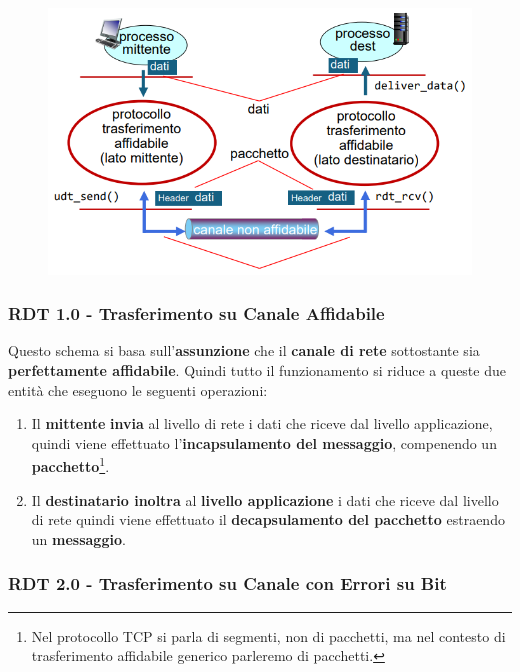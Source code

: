 \documentclass{article}
\begin{document}
\begin{figure}[htbp]
    \center
    \includegraphics[scale=0.65]{img/trasferimentoAffidabile1.png}
\end{figure}

\newpage

\subsubsection{RDT 1.0 - Trasferimento su Canale Affidabile}

Questo schema si basa sull'\textbf{assunzione} che il \textbf{canale di rete} sottostante sia \textbf{perfettamente affidabile}.
Quindi tutto il funzionamento si riduce a queste due entità che eseguono le seguenti operazioni:

\begin{enumerate}
    \item Il \textbf{mittente} \textbf{invia} al livello di rete i dati che riceve dal livello applicazione, quindi viene effettuato l'\textbf{incapsulamento del messaggio}, compenendo un \textbf{pacchetto}\footnote{Nel protocollo TCP si parla di segmenti, non di pacchetti, ma nel contesto di trasferimento affidabile generico parleremo di pacchetti.}.
    \item Il \textbf{destinatario inoltra} al \textbf{livello applicazione} i dati che riceve dal livello di rete quindi viene effettuato il \textbf{decapsulamento del pacchetto} estraendo un \textbf{messaggio}.
\end{enumerate}

\subsubsection{RDT 2.0 - Trasferimento su Canale con Errori su Bit}
\end{document}
